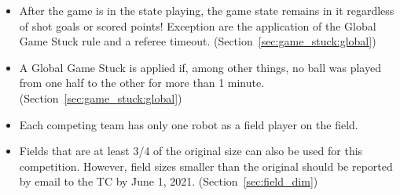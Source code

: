 \begin{itemize}
	\item After the game is in the state playing, the game state remains in it regardless of shot goals or scored points! Exception are the application of the Global Game Stuck rule and a referee timeout. (\cf Section~\ref{sec:game_stuck:global})
	
	\item A Global Game Stuck is applied if, among other things, no ball was played from one half to the other for more than 1 minute. (\cf Section~\ref{sec:game_stuck:global})
		
	\item Each competing team has only one robot as a field player on the field.
		
	\item Fields that are at least 3/4 of the original size can also be used for this competition. However, field sizes smaller than the original should be reported by email to the TC by June 1, 2021. (\cf Section~\ref{sec:field_dim})
\end{itemize}

